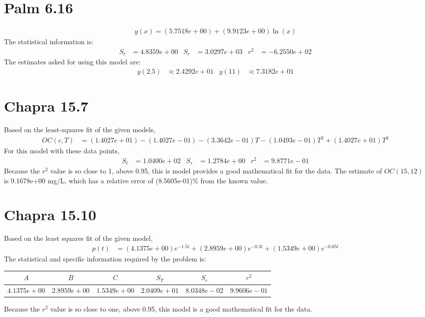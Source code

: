 \documentclass{article}
\begin{document}
\section{Palm 6.16}
\begin{align*}
y(x) = (5.7518e+00)+(9.9123e+00)\ln(x)
\end{align*}
The statistical information is:
\begin{align*}
S_t&=4.8359e+00 & S_r &= 3.0297e+03 & r^2 &=-6.2550e+02
\end{align*}
The estimates asked for using this model are:
\begin{align*}
y(2.5)&\approx 2.4292e+01  & y(11)&\approx 7.3182e+01
\end{align*}

\section{Chapra 15.7}
Based on the least-squares fit of the given models,
\begin{align*}
OC(c,T)&=(1.4027e+01)-(1.4027e-01)-(3.3642e-01)T-(1.0493e-01)T^2+(1.4027e+01)T^3
\end{align*}
For this model with these data points, 
\begin{align*}
S_t &= 1.0400e+02 &
S_r &= 1.2784e+00 &
r^2 &= 9.8771e-01
\end{align*}
Because the $r^2$ value is so close to 1, above 0.95, this is model provides a good mathematical fit for the data.  The estimate of $OC(15,12)$ is 9.1678e+00 mg/L, which has a
relative error of (8.5605e-01)\% from the known value.

\section{Chapra 15.10}
Based on the least squares fit of the given model,
\begin{align*}
p(t)&= (4.1375e+00)e^{-1.5t} + (2.8959e+00)e^{-0.3t} + (1.5349e+00)e^{-0.05t}
\end{align*}
The statistical and specific information required by the problem is:
\begin{center}
\begin{tabular}{|c|c|c|c|c|c|}\hline
$A$ & $B$ & $C$ & $S_T$ & $S_r$ & $r^2$ \\ \hline
$4.1375e+00$ & $2.8959e+00$ & $1.5349e+00$ & $2.0409e+01$ & $8.0348e-02$ & $9.9606e-01$\\ \hline
\end{tabular}
\end{center}
Because the $r^2$ value is so close to one, above 0.95, this model is a good mathematical fit for the data.
\end{document}
